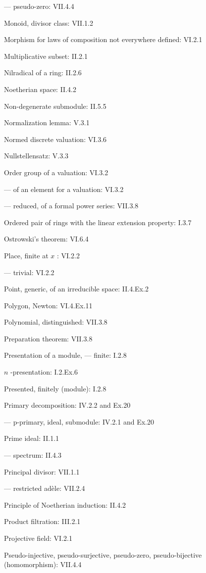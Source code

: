 --- pseudo-zero: VII.4.4

Monoid, divisor class: VII.1.2

Morphism for laws of composition not everywhere defined: VI.2.1

Multiplicative subset: II.2.1

Nilradical of a ring: II.2.6

Noetherian space: II.4.2

Non-degenerate submodule: II.5.5

Normalization lemma: V.3.1

Normed discrete valuation: VI.3.6

Nullstellensatz: V.3.3

Order group of a valuation: VI.3.2

--- of an element for a valuation: VI.3.2

--- reduced, of a formal power series: VII.3.8

Ordered pair of rings with the linear extension property: I.3.7

Ostrowski's theorem: VI.6.4

Place, finite at \(x\) : VI.2.2

--- trivial: VI.2.2

Point, generic, of an irreducible space: II.4.Ex.2

Polygon, Newton: VI.4.Ex.11

Polynomial, distinguished: VII.3.8

Preparation theorem: VII.3.8

Presentation of a module, --- finite: I.2.8

\(n\) -presentation: I.2.Ex.6

Presented, finitely (module): I.2.8

Primary decomposition: IV.2.2 and Ex.20

--- p-primary, ideal, submodule: IV.2.1 and Ex.20

Prime ideal: II.1.1

--- spectrum: II.4.3

Principal divisor: VII.1.1

--- restricted adèle: VII.2.4

Principle of Noetherian induction: II.4.2

Product filtration: III.2.1

Projective field: VI.2.1

Pseudo-injective, pseudo-surjective, pseudo-zero, pseudo-bijective (homomorphism): VII.4.4

